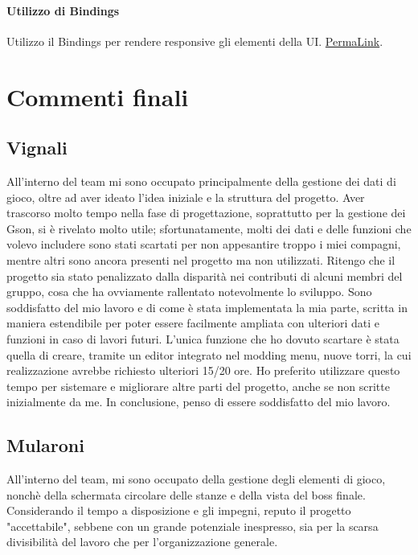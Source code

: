 \documentclass[a4paper,12pt]{report}
\begin{document}
\subsubsection{Utilizzo di Bindings}
Utilizzo il Bindings per rendere responsive gli elementi della UI.\newline
\href{https://github.com/Matt2309/temple-tower/blob/297b37062035f41c3e9258656beace208905a368/src/main/java/it/unibo/templetower/view/TreasureView.java#L79}{PermaLink}.

\chapter{Commenti finali}

\section{Vignali}
All'interno del team mi sono occupato principalmente della gestione dei dati di gioco, oltre ad aver ideato l'idea iniziale e la struttura del progetto.  
Aver trascorso molto tempo nella fase di progettazione, soprattutto per la gestione dei Gson, si è rivelato molto utile; sfortunatamente, molti dei dati e delle funzioni che volevo includere sono stati scartati per non appesantire troppo i miei compagni, mentre altri sono ancora presenti nel progetto ma non utilizzati.  
Ritengo che il progetto sia stato penalizzato dalla disparità nei contributi di alcuni membri del gruppo, cosa che ha ovviamente rallentato notevolmente lo sviluppo.  
Sono soddisfatto del mio lavoro e di come è stata implementata la mia parte, scritta in maniera estendibile per poter essere facilmente ampliata con ulteriori dati e funzioni in caso di lavori futuri.  
L'unica funzione che ho dovuto scartare è stata quella di creare, tramite un editor integrato nel modding menu, nuove torri, la cui realizzazione avrebbe richiesto ulteriori 15/20 ore. Ho preferito utilizzare questo tempo per sistemare e migliorare altre parti del progetto, anche se non scritte inizialmente da me.
In conclusione, penso di essere soddisfatto del mio lavoro.
\section{Mularoni}
All'interno del team, mi sono occupato della gestione degli elementi di gioco, nonchè della schermata circolare delle stanze e della vista del boss finale.\newline
Considerando il tempo a disposizione e gli impegni, reputo il progetto "accettabile", sebbene con un grande potenziale inespresso, sia per la scarsa divisibilità del lavoro che per l'organizzazione generale.
\end{document}
